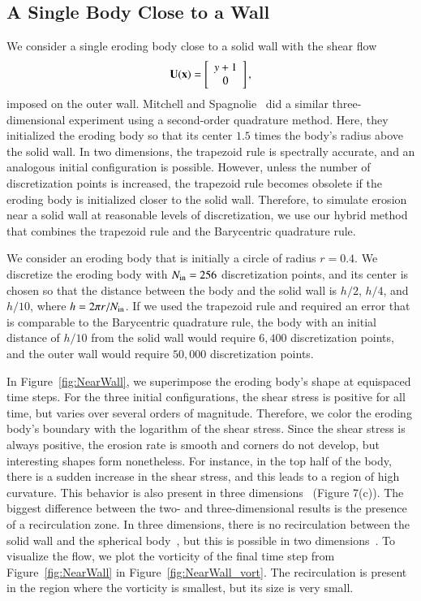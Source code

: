 \documentclass[preprint,10pt]{elsarticle}
\begin{document}
\subsection{A Single Body Close to a Wall}
We consider a single eroding body close to a solid wall with the
shear flow
\begin{align}
  {\mathbf{U}}({\mathbf{x}})=\left[
  \begin{array}{c}
    y+1 \\ 0
  \end{array}
  \right],
\end{align}
imposed on the outer wall. Mitchell and Spagnolie~ did
a similar three-dimensional experiment using a second-order quadrature
method. Here, they initialized the eroding body so that its center $1.5$
times the body's radius above the solid wall.  In two dimensions, the
trapezoid rule is spectrally accurate, and an analogous initial
configuration is possible. However, unless the number of discretization
points is increased, the trapezoid rule becomes obsolete if the eroding
body is initialized closer to the solid wall. Therefore, to simulate
erosion near a solid wall at reasonable levels of discretization, we use
our hybrid method that combines the trapezoid rule and the Barycentric
quadrature rule.

We consider an eroding body that is initially a circle of radius
$r=0.4$.  We discretize the eroding body with $N_{\mathrm{in}}=256$
discretization points, and its center is chosen so that the distance
between the body and the solid wall is $h/2$, $h/4$, and $h/10$, where
$h = 2\pi r/N_{\mathrm{in}}$.  If we used the trapezoid rule and required an
error that is comparable to the Barycentric quadrature rule, the body
with an initial distance of $h/10$ from the solid wall would require
$6,400$ discretization points, and the outer wall would require $50,000$
discretization points.

In Figure~\ref{fig:NearWall}, we superimpose the eroding body's shape at
equispaced time steps.  For the three initial configurations, the shear
stress is positive for all time, but varies over several orders of
magnitude.  Therefore, we color the eroding body's boundary with the
logarithm of the shear stress.  Since the shear stress is always
positive, the erosion rate is smooth and corners do not develop, but
interesting shapes form nonetheless.  For instance, in the top half of
the body, there is a sudden increase in the shear stress, and this leads
to a region of high curvature.  This behavior is also present in three
dimensions~\cite{mit-spa2017} (Figure 7(c)).  The biggest difference
between the two- and three-dimensional results is the presence of a
recirculation zone.  In three dimensions, there is no recirculation
between the solid wall and the spherical body~\cite{cha-feu2003}, but
this is possible in two dimensions~\cite{chw-wu1975, hig1985}. To
visualize the flow, we plot the vorticity of the final time step from
Figure~\ref{fig:NearWall} in Figure~\ref{fig:NearWall_vort}.  The
recirculation is present in the region where the vorticity is smallest,
but its size is very small.
\end{document}
